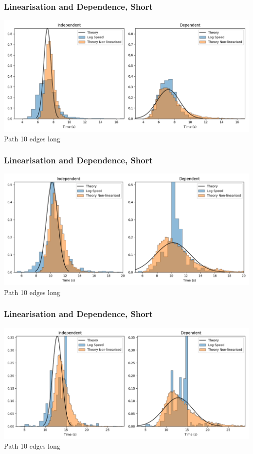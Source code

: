 \documentclass{beamer}
\begin{document}
	\begin{frame}
		\frametitle{Linearisation and Dependence, Short}
		\includegraphics[width=\textwidth,height=\textheight,keepaspectratio]{non-lin10-10A.png}
		Path 10 edges long
	\end{frame}
	\begin{frame}
		\frametitle{Linearisation and Dependence, Short}
		\includegraphics[width=\textwidth,height=\textheight,keepaspectratio]{non-lin10-10B.png}
		Path 10 edges long
	\end{frame}
	\begin{frame}
		\frametitle{Linearisation and Dependence, Short}
		\includegraphics[width=\textwidth,height=\textheight,keepaspectratio]{non-lin8-10A.png}
		Path 10 edges long
	\end{frame}
\end{document}

